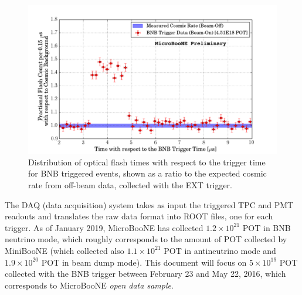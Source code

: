 \begin{figure}[htbp]
    \centering
    \includegraphics[width=0.85\linewidth]{figures/trigger.pdf}
    \caption{Distribution of optical flash times with respect to the trigger time for BNB triggered events, shown as a ratio to the expected cosmic rate from off-beam data, collected with the EXT trigger.}
    \label{fig:trigger}
\end{figure}

The DAQ (data acquisition) system takes as input the triggered TPC and PMT readouts and translates the raw data format into ROOT files, one for each trigger. As of January 2019, MicroBooNE has collected $1.2\times10^{21}$ POT in BNB neutrino mode, which roughly corresponds to the amount of POT collected by MiniBooNE (which collected also $1.1\times10^{21}$ POT in antineutrino mode and $1.9\times10^{20}$ POT in beam dump mode).
This document will focus on $5\times10^{19}$ POT collected with the BNB trigger between February 23 and May 22, 2016, which corresponds to MicroBooNE \emph{open data sample}.